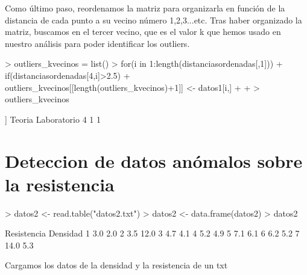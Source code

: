 \documentclass [a4paper] {article}
\begin{document}
Como último paso, reordenamos la matriz para organizarla en función de la distancia
de cada punto a su vecino número 1,2,3...etc. Tras haber organizado la matriz, buscamos en el tercer
vecino, que es el valor k que hemos usado en nuestro análisis para poder identificar los outliers.
\begin{Schunk}
\begin{Sinput}
> outliers_kvecinos = list()
> for(i in 1:length(distanciasordenadas[,1])){
+   if(distanciasordenadas[4,i]>2.5){
+     outliers_kvecinos[[length(outliers_kvecinos)+1]] <- datos1[i,]
+   }
+ }
> outliers_kvecinos
\end{Sinput}
\begin{Soutput}
[[1]]
  Teoria Laboratorio
4      1           1
\end{Soutput}
\end{Schunk}



\section{Deteccion de datos anómalos sobre la resistencia }

\begin{Schunk}
\begin{Sinput}
> datos2 <- read.table("datos2.txt")
> datos2 <- data.frame(datos2)
> datos2
\end{Sinput}
\begin{Soutput}
  Resistencia Densidad
1         3.0      2.0
2         3.5     12.0
3         4.7      4.1
4         5.2      4.9
5         7.1      6.1
6         6.2      5.2
7        14.0      5.3
\end{Soutput}
\end{Schunk}

Cargamos los datos de la densidad y la resistencia de un txt
\end{document}
